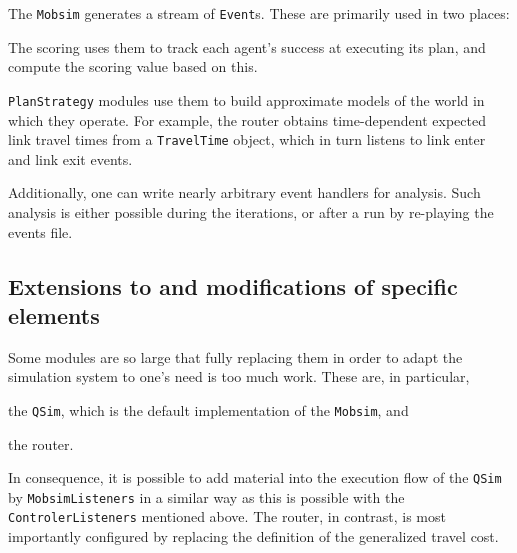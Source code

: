 The \lstinline$Mobsim$ generates a stream of \lstinline$Event$s.  These are primarily used in two places:
\begin{compactitem}

\item The scoring uses them to track each agent's success at executing its plan, and compute the scoring value based on this.

\item \lstinline$PlanStrategy$ modules use them to build approximate models of the world in which they operate.  For example, the router obtains time-dependent expected link travel times from a \lstinline$TravelTime$ object, which in turn listens to link enter and link exit events.
  
\end{compactitem}
Additionally, one can write nearly arbitrary event handlers for analysis.
Such analysis is either possible during the iterations, or after a run by re-playing the events file.


\subsection{Extensions to and modifications of specific elements}

Some modules are so large that fully replacing them in order to adapt the simulation system to one's need is too much work.  These are, in particular,
\begin{compactitem}
\item the \lstinline$QSim$, which is the default implementation of the \lstinline$Mobsim$, and
\item the router.
\end{compactitem}
In consequence, it is possible to add material into the execution flow of the \lstinline$QSim$ by \lstinline$MobsimListeners$ in a similar way as this is possible with the \lstinline$ControlerListeners$ mentioned above.
%
The router, in contrast, is most importantly configured by replacing the definition of the generalized travel cost. 

